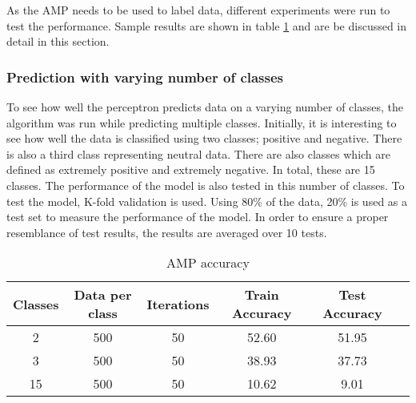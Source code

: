 
\begin{comment}
Experiments / Empirical evaluation (roughly 2-3 pages)
• Any details about experiments (dataset sizes, parameter selection, etc)
• Results
• Analysis (discussion of results / visualization / findings / etc)
\end{comment}

As the AMP needs to be used to label data, different experiments were run to test the performance. Sample results are shown in table \ref{table:AMPaccuracy} and are be discussed in detail in this section.

\subsubsection{Prediction with varying number of classes}
To see how well the perceptron predicts data on a varying number of classes, the algorithm was run while predicting multiple classes. Initially, it is interesting to see how well the data is classified using two classes; positive and negative. There is also a third class representing neutral data. There are also classes which are defined as extremely positive and extremely negative. In total, these are 15 classes. The performance of the model is also tested in this number of classes. To test the model, K-fold validation is used. Using 80\% of the data, 20\% is used as a test set to measure the performance of the model. In order to ensure a proper resemblance of test results, the results are averaged over 10 tests.

\begin{table}[h!]
\begin{center}
\begin{tabular}{| c | c | c | c | c | c |}
\hline
 {\textbf{Classes}} 	 
 & {\textbf{Data per class}} 					& {\textbf{Iterations}} 
 & {\textbf{Train Accuracy}} 					& {\textbf{Test Accuracy}} 
 \\
\hline
2	&	500	&	50	&	52.60	& 	51.95	\\
3	&	500	&	50	&	38.93	&	37.73	\\
15	&	500	&	50	&	10.62	&	9.01		\\
\hline
\end{tabular}
\caption{AMP accuracy}
\label{table:AMPaccuracy}
\end{center}
\end{table}


